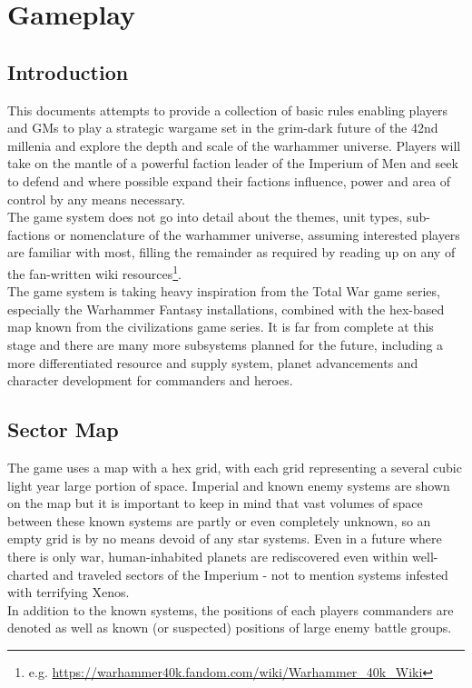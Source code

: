 \chapter{Gameplay}
\section{Introduction}
This documents attempts to provide a collection of basic rules enabling players and GMs to play a strategic wargame set in the grim-dark future of the 42nd millenia and explore the depth and scale of the warhammer universe. Players will take on the mantle of a powerful faction leader of the Imperium of Men and seek to defend and where possible expand their factions influence, power and area of control by any means necessary.\\
The game system does not go into detail about the themes, unit types, sub-factions or nomenclature of the warhammer universe, assuming interested players are familiar with most, filling the remainder as required by reading up on any of the fan-written wiki resources\footnote{e.g. \url{https://warhammer40k.fandom.com/wiki/Warhammer_40k_Wiki}}.\\
The game system is taking heavy inspiration from the Total War game series, especially the Warhammer Fantasy installations, combined with the hex-based map known from the civilizations game series. It is far from complete at this stage and there are many more subsystems planned for the future, including a more differentiated resource and supply system, planet advancements and character development for commanders and heroes.

\section{Sector Map}
The game uses a map with a hex grid, with each grid representing a several cubic light year large portion of space. 
Imperial and known enemy systems are shown on the map but it is important to keep in mind that vast volumes of space between these known systems are partly or even completely unknown, so an empty grid is by no means devoid of any star systems. Even in a future where there is only war, human-inhabited planets are rediscovered even within well-charted and traveled sectors of the Imperium - not to mention systems infested with terrifying Xenos.\\
In addition to the known systems, the positions of each players commanders are denoted as well as known (or suspected) positions of large enemy battle groups.

